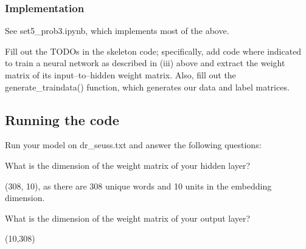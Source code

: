 \subsubsection{Implementation}

See set5_prob3.ipynb, which implements most of the above.

\problem[10]
Fill out the TODOs in the skeleton code; specifically, add code where indicated to train a neural network as described in (iii) above and extract the weight matrix of its input--to--hidden weight matrix. Also, fill out the generate\_traindata() function, which generates our data and label matrices.


\begin{solution}

\end{solution}

\subsection{Running the code}
Run your model on dr_seuss.txt and answer the following questions:

\problem[2]
What is the dimension of the weight matrix of your hidden layer?

\begin{solution}
 (308, 10), as there are 308 unique words and 10 units in the embedding dimension.
\end{solution}

\problem[2]
What is the dimension of the weight matrix of your output layer?
\begin{solution}
(10,308)
\end{solution}

